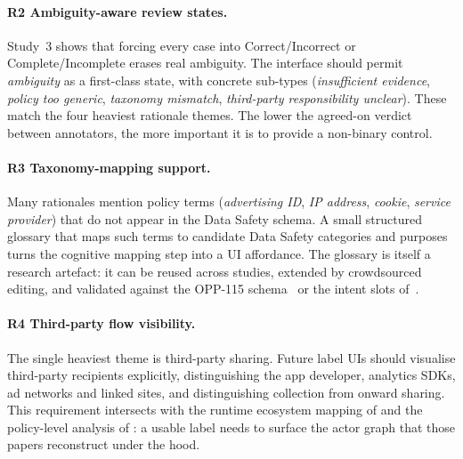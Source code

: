 \documentclass[11pt,a4paper]{article}
\newcommand{\dgrule}[1]{\textsf{R#1}}
\begin{document}
\paragraph{\dgrule{2} Ambiguity-aware review states.}
Study~3 shows that forcing every case into Correct/Incorrect or
Complete/Incomplete erases real ambiguity. The interface should permit
\emph{ambiguity} as a first-class state, with concrete sub-types
(\emph{insufficient evidence}, \emph{policy too generic},
\emph{taxonomy mismatch}, \emph{third-party responsibility unclear}).
These match the four heaviest rationale themes. The lower the agreed-on
verdict between annotators, the more important it is to provide a
non-binary control.

\paragraph{\dgrule{3} Taxonomy-mapping support.}
Many rationales mention policy terms (\emph{advertising ID},
\emph{IP address}, \emph{cookie}, \emph{service provider}) that do not
appear in the Data Safety schema. A small structured glossary that
maps such terms to candidate Data Safety categories and purposes turns
the cognitive mapping step into a UI affordance. The glossary is itself
a research artefact: it can be reused across studies, extended by
crowdsourced editing, and validated against the OPP-115
schema~\citep{wilson2016creation} or the intent slots
of~\citet{ahmad2021intent}.

\paragraph{\dgrule{4} Third-party flow visibility.}
The single heaviest theme is third-party sharing. Future label UIs
should visualise third-party recipients explicitly, distinguishing the
app developer, analytics SDKs, ad networks and linked sites, and
distinguishing collection from onward sharing. This requirement
intersects with the runtime ecosystem mapping of
\citet{razaghpanah2018apps} and the policy-level analysis of
\citet{andow2020policheck}: a usable label needs to surface the actor
graph that those papers reconstruct under the hood.
\end{document}
